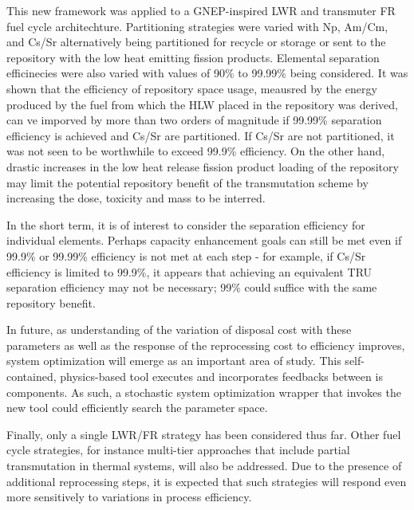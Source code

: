 This new framework was applied to a GNEP-inspired LWR and transmuter 
FR fuel cycle architechture.  Partitioning strategies were varied with 
Np, Am/Cm, and Cs/Sr alternatively being partitioned for recycle or storage 
or sent to the repository with the low heat emitting fission products.
Elemental separation efficinecies were also varied with values of
90\% to 99.99\% being considered.  It was shown that the efficiency 
of repository space usage, meausred by the energy produced by the fuel from
which the HLW placed in the repository was derived, can ve imporved by 
more than two orders of magnitude if 99.99\% separation efficiency is 
achieved and Cs/Sr are partitioned.  If Cs/Sr are not partitioned, it was not seen
to be worthwhile to exceed 99.9\% efficiency.  On the other hand,
drastic increases in the low heat release fission product loading of the
repository may limit the potential repository benefit of the
transmutation scheme by increasing the dose, toxicity and mass to be
interred.

In the short term, it is of interest to consider the separation
efficiency for individual elements.  Perhaps capacity enhancement goals
can still be met even if 99.9\% or 99.99\% efficiency is not met at each
step - for example, if Cs/Sr efficiency is limited to 99.9\%, it
appears that achieving an equivalent TRU separation efficiency may not
be necessary; 99\% could suffice with the same repository benefit.  

In future, as understanding of the variation of disposal cost with
these parameters as well as the response of the reprocessing cost to
efficiency improves, system optimization will emerge as an important
area of study.  This self-contained, physics-based tool executes and
incorporates feedbacks between is components.  As such, a stochastic
system optimization wrapper that invokes the new tool could efficiently
search the parameter space.

Finally, only a single LWR/FR strategy has been considered thus far. 
Other fuel cycle strategies, for instance multi-tier approaches that
include partial transmutation in thermal systems, will also be
addressed.  Due to the presence of additional reprocessing steps, it is
expected that such strategies will respond even more sensitively to
variations in process efficiency.


